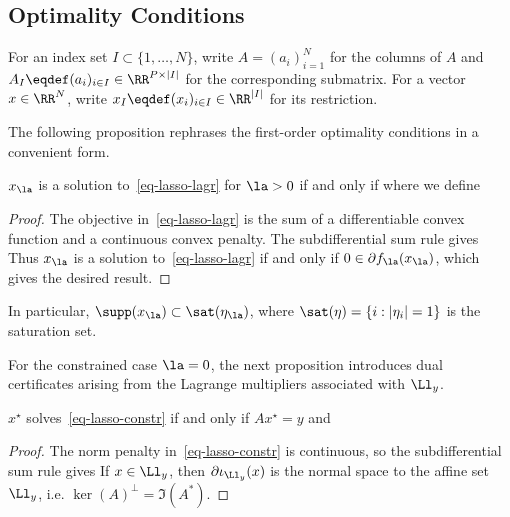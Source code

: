\subsection{Optimality Conditions}

For an index set $I \subset \{1,\ldots,N\}$, write $A=(a_i)_{i=1}^N$ for the columns of $A$ and $A_I \eqdef (a_i)_{i \in I} \in \RR^{P \times |I|}$ for the corresponding submatrix. For a vector $x \in \RR^N$, write $x_I \eqdef (x_i)_{i \in I} \in \RR^{|I|}$ for its restriction.

The following proposition rephrases the first-order optimality conditions in a convenient form.

\begin{prop}\label{prop-first-order-lagr}
	$x_\la$ is a solution to~\eqref{eq-lasso-lagr} for $\la>0$ if and only if
	where we define
\end{prop}
\begin{proof}
The objective in~\eqref{eq-lasso-lagr} is the sum of a differentiable convex function and a continuous convex penalty. The subdifferential sum rule gives
Thus $x_\la$ is a solution to~\eqref{eq-lasso-lagr} if and only if $0 \in \partial f_\la(x_\la)$, which gives the desired result.
\end{proof}

In particular, $\supp(x_\la) \subset \sat(\eta_\la)$, where $\sat(\eta)=\{i:|\eta_i|=1\}$ is the saturation set.

For the constrained case $\la=0$, the next proposition introduces dual certificates arising from the Lagrange multipliers associated with $\Ll_y$.

\begin{prop}\label{prop-first-order-constr}
	$x^\star$ solves~\eqref{eq-lasso-constr} if and only if $Ax^\star=y$ and
\end{prop}
\begin{proof}
The norm penalty in~\eqref{eq-lasso-constr} is continuous, so the subdifferential sum rule gives
If $x \in \Ll_y$, then $\partial \iota_{\Ll_y}(x)$ is the normal space to the affine set $\Ll_y$, i.e. $\ker(A)^\bot=\Im(A^*)$.
\end{proof}

